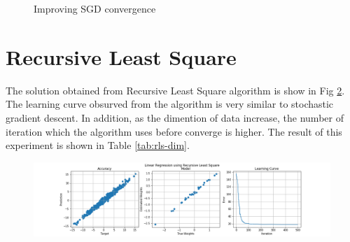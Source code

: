 \documentclass{article}
\begin{document}
\begin{figure}[H]
    \centering
    \qquad
    \caption{Improving SGD convergence}%
    \label{fig:sgd-improve}%
\end{figure}

\section{Recursive Least Square}

The solution obtained from Recursive Least Square algorithm is show in Fig \ref{fig:rls}. The learning curve obsurved from the algorithm is very similar to stochastic gradient descent. In addition, as the dimention of data increase, the number of iteration which the algorithm uses before converge is higher. The result of this experiment is shown in Table \ref{tab:rls-dim}.
\begin{figure}[H]
\begin{center}
\includegraphics[scale=0.35]{RLS.png}
\label{fig:rls}
\end{center}
\end{figure}
\end{document}
